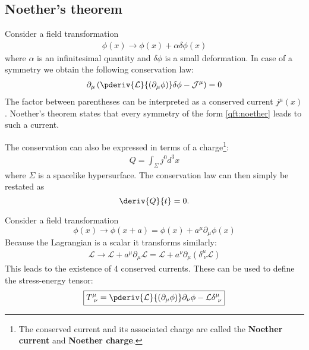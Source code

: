 \subsection{Noether's theorem}

	\begin{theorem}\label{qft:noethers_theorem}
		Consider a field transformation
		\begin{gather}
			\label{qft:noether}
			\phi(x)\rightarrow \phi(x) + \alpha\delta\phi(x)
		\end{gather}
		where $\alpha$ is an infinitesimal quantity and $\delta\phi$ is a small deformation. In case of a symmetry we obtain the following conservation law:
		 \begin{gather}
		 	\label{qft:conserved_current}
		 	\partial_\mu\left(\pderiv{\mathcal{L}}{(\partial_\mu\phi)}\delta\phi - \mathcal{J}^\mu\right) = 0
		 \end{gather}
		 The factor between parentheses can be interpreted as a conserved current $j^\mu(x)$. Noether's theorem states that every symmetry of the form \ref{qft:noether} leads to such a current.
		 
		 The conservation can also be expressed in terms of a charge\footnote{The conserved current and its associated charge are called the \textbf{Noether current} and \textbf{Noether charge}.}:
		 \begin{gather}
		 	Q = \int_\Sigma j^0d^3x
		 \end{gather}
		 where $\Sigma$ is a spacelike hypersurface. The conservation law can then simply be restated as \[\deriv{Q}{t} = 0.\]
	\end{theorem}

	\begin{definition}
		Consider a field transformation
		\[
			\phi(x)\rightarrow\phi(x+a) = \phi(x) + a^\mu\partial_\mu\phi(x)
		\]
		Because the Lagrangian is a scalar it transforms similarly:
		\begin{gather}
			\mathcal{L}\rightarrow\mathcal{L} + a^\mu\partial_\mu\mathcal{L} = \mathcal{L} + a^\nu\partial_\mu(\delta^\mu_{\ \nu}\mathcal{L})
		\end{gather}
		This leads to the existence of 4 conserved currents. These can be used to define the stress-energy tensor:
		\begin{gather}
			\label{relativity:stress_energy_tensor}
			\boxed{T^\mu_{\ \nu} = \pderiv{\mathcal{L}}{(\partial_\mu\phi)}\partial_\nu\phi - \mathcal{L}\delta^\mu_{\ \nu}}
		\end{gather}
	\end{definition}

